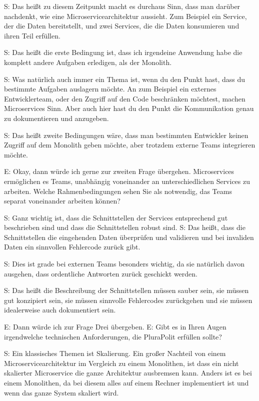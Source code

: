 S: Das heißt zu diesem Zeitpunkt macht es durchaus Sinn, dass man darüber nachdenkt, wie eine Microservicearchitektur aussieht. Zum Beispiel ein Service, der die Daten bereitstellt, und zwei Services, die die Daten konsumieren und ihren Teil erfüllen.

S: Das heißt die erste Bedingung ist, dass ich irgendeine Anwendung habe die komplett andere Aufgaben erledigen, als der Monolith.

S: Was natürlich auch immer ein Thema ist, wenn du den Punkt hast, dass du bestimmte Aufgaben auslagern möchte. An zum Beispiel ein externes Entwicklerteam, oder den Zugriff auf den Code beschränken möchtest, machen Microservices Sinn. Aber auch hier hast du den Punkt die Kommunikation genau zu dokumentieren und anzugeben.

S: Das heißt zweite Bedingungen wäre, dass man bestimmten Entwickler keinen Zugriff auf dem Monolith geben möchte, aber trotzdem externe Teams integrieren möchte.

E: Okay, dann würde ich gerne zur zweiten Frage übergehen.
Microservices ermöglichen es Teams, unabhängig voneinander an unterschiedlichen Services zu arbeiten. Welche Rahmenbedingungen sehen Sie als notwendig, das Teams separat voneinander arbeiten können? 

S: Ganz wichtig ist, dass die Schnittstellen der Services entsprechend gut beschrieben sind und dass die Schnittstellen robust sind.
S: Das heißt, dass die Schnittstellen die eingehenden Daten überprüfen und validieren und bei invaliden Daten ein sinnvollen Fehlercode zurück gibt.

S: Dies ist grade bei externen Teams besonders wichtig, da sie natürlich davon ausgehen, dass  ordentliche Antworten zurück geschickt werden.

S: Das heißt die Beschreibung der Schnittstellen müssen sauber sein, sie müssen gut konzipiert sein, sie müssen sinnvolle Fehlercodes zurückgehen und sie müssen idealerweise auch dokumentiert sein.

E: Dann würde ich zur Frage Drei übergeben. 
E: Gibt es in Ihren Augen irgendwelche technischen Anforderungen, die PluraPolit erfüllen sollte? 

S: Ein klassisches Themen ist Skalierung. Ein großer Nachteil von einem Microservicearchitektur im Vergleich zu einem Monolithen, ist dass ein nicht skalierter Microservice die ganze Architektur ausbremsen kann. Anders ist es bei einem Monolithen, da bei diesem alles auf einem Rechner implementiert ist und wenn das ganze System skaliert wird.

